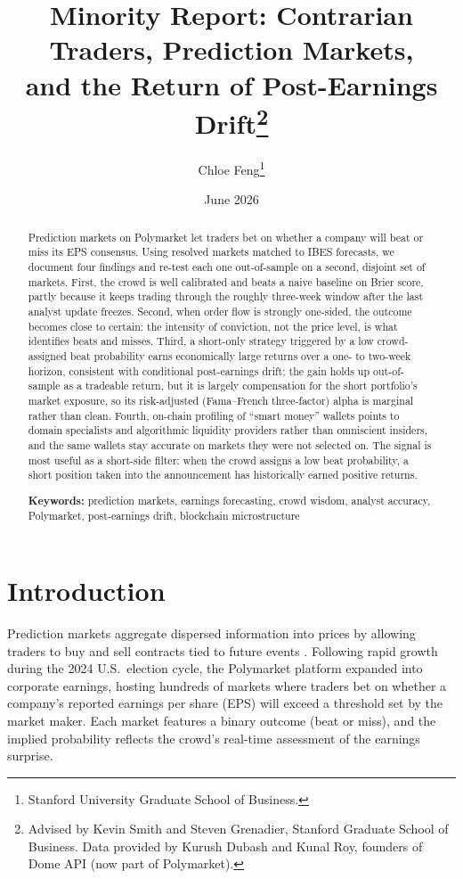 \documentclass[11pt]{article}
\title{\Large \textbf{Minority Report: Contrarian Traders, Prediction Markets,\\and the Return of Post-Earnings Drift}\thanks{Advised by Kevin Smith and Steven Grenadier, Stanford Graduate School of Business. Data provided by Kurush Dubash and Kunal Roy, founders of Dome API (now part of Polymarket).}}
\author{Chloe Feng\thanks{Stanford University Graduate School of Business.}}
\date{June 2026}
\begin{document}
\maketitle

\begin{abstract}
\noindent
Prediction markets on Polymarket let traders bet on whether a company will beat or miss its EPS consensus. Using resolved markets matched to IBES forecasts, we document four findings and re-test each one out-of-sample on a second, disjoint set of markets. First, the crowd is well calibrated and beats a naive baseline on Brier score, partly because it keeps trading through the roughly three-week window after the last analyst update freezes. Second, when order flow is strongly one-sided, the outcome becomes close to certain: the intensity of conviction, not the price level, is what identifies beats and misses. Third, a short-only strategy triggered by a low crowd-assigned beat probability earns economically large returns over a one- to two-week horizon, consistent with conditional post-earnings drift; the gain holds up out-of-sample as a tradeable return, but it is largely compensation for the short portfolio's market exposure, so its risk-adjusted (Fama--French three-factor) alpha is marginal rather than clean. Fourth, on-chain profiling of ``smart money'' wallets points to domain specialists and algorithmic liquidity providers rather than omniscient insiders, and the same wallets stay accurate on markets they were not selected on. The signal is most useful as a short-side filter: when the crowd assigns a low beat probability, a short position taken into the announcement has historically earned positive returns.

\medskip
\noindent
\textbf{Keywords:} prediction markets, earnings forecasting, crowd wisdom, analyst accuracy, Polymarket, post-earnings drift, blockchain microstructure
\end{abstract}

\thispagestyle{empty}
\newpage
\setcounter{page}{1}

\section{Introduction}

Prediction markets aggregate dispersed information into prices by allowing traders to buy and sell contracts tied to future events \citep{wolfers2004prediction, arrow2008promise}. Following rapid growth during the 2024 U.S.\ election cycle, the Polymarket platform expanded into corporate earnings, hosting hundreds of markets where traders bet on whether a company's reported earnings per share (EPS) will exceed a threshold set by the market maker. Each market features a binary outcome (beat or miss), and the implied probability reflects the crowd's real-time assessment of the earnings surprise.
\end{document}
